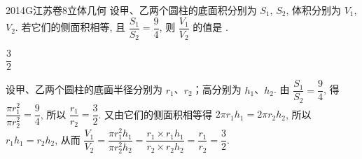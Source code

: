 
\begin{problem}{2014}{G}{江苏卷}{8}{立体几何}
设甲、乙两个圆柱的底面积分别为 $ S_1 $, $ S_2 $, 体积分别为 $ V_1 $, $ V_2 $. 若它们的侧面积相等, 且 $ \dfrac{S_1}{S_2} = \dfrac{9}{4} $, 则 $ \dfrac{V_1}{V_2} $ 的值是 \underline{\hspace{4em}}.
\end{problem}

\begin{answer}
$ \dfrac{3}{2} $
\end{answer}

\begin{solutions}
设甲、乙两个圆柱的底面半径分别为 $ r_1 $、$ r_2 $；高分别为 $ h_1 $、$ h_2 $.  
由 $ \dfrac{S_1}{S_2} = \dfrac{9}{4} $, 得 $ \dfrac{\pi r_1^2}{\pi r_2^2} = \dfrac{9}{4} $, 所以 $ \dfrac{r_1}{r_2} = \dfrac{3}{2} $.  
又由它们的侧面积相等得 $ 2\pi r_1 h_1 = 2\pi r_2 h_2 $, 所以 $ r_1 h_1 = r_2 h_2 $,  
从而 $ \dfrac{V_1}{V_2} = \dfrac{\pi r_1^2 h_1}{\pi r_2^2 h_2} = \dfrac{r_1 \times r_1 h_1}{r_2 \times r_2 h_2} = \dfrac{r_1}{r_2} = \dfrac{3}{2} $.
\end{solutions}